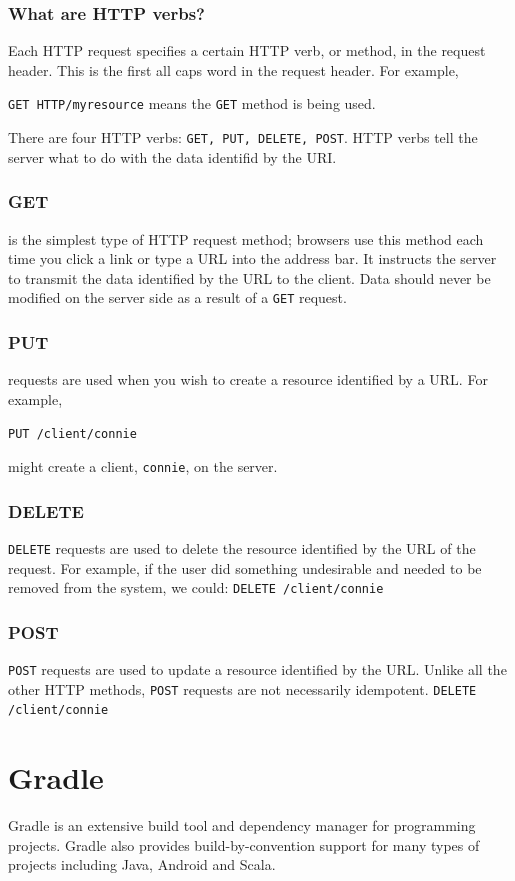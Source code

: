\documentclass[oneside]{book}
\begin{document}
\subsubsection{What are HTTP verbs?}
Each HTTP request specifies a certain HTTP verb, or method, in the request header. This is the first all caps word in the request header. For example, \par
\texttt{GET HTTP/myresource} means the \texttt{GET} method is being used.\par
There are four HTTP verbs: \texttt{GET, PUT, DELETE, POST}. HTTP verbs tell the server what to do with the data identifid by the URI.
\subsubsection{GET} is the simplest type of HTTP request method; browsers use this method each time you click a link or type a URL into the address bar. It instructs the server to transmit the data identified by the URL to the client. Data should never be modified on the server side as a result of a \texttt{GET} request.
\subsubsection{PUT} requests are used when you wish to create a resource identified by a URL. For example,\par
\texttt{PUT /client/connie} \par
might create a client, \texttt{connie}, on the server. 
\subsubsection{DELETE}  
\texttt{DELETE} requests are used to delete the resource identified by the URL of the request. For example, if the user did something undesirable and needed to be removed from the system, we could:
\texttt{DELETE /client/connie}
\subsubsection{POST}  
\texttt{POST} requests are used to update a resource identified by the URL. Unlike all the other HTTP methods, \texttt{POST} requests are not necessarily idempotent.
\texttt{DELETE /client/connie}
\section{Gradle}
Gradle is an extensive build tool and dependency manager for programming projects. Gradle also provides build-by-convention support for many types of projects including Java, Android and Scala.
\end{document}
